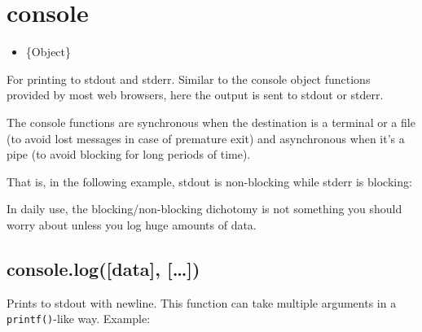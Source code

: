 \section{console}\label{console}

\begin{Shaded}
\begin{Highlighting}[]
 
\end{Highlighting}
\end{Shaded}

\begin{itemize}
\itemsep1pt\parskip0pt
\item
  \{Object\}
\end{itemize}

For printing to stdout and stderr. Similar to the console object
functions provided by most web browsers, here the output is sent to
stdout or stderr.

The console functions are synchronous when the destination is a terminal
or a file (to avoid lost messages in case of premature exit) and
asynchronous when it's a pipe (to avoid blocking for long periods of
time).

That is, in the following example, stdout is non-blocking while stderr
is blocking:

\begin{Shaded}
\begin{Highlighting}[]
 \NormalTok{> } 
\end{Highlighting}
\end{Shaded}

In daily use, the blocking/non-blocking dichotomy is not something you
should worry about unless you log huge amounts of data.

\subsection{console.log({[}data{]},
{[}\ldots{}{]})}\label{console.logdata}

Prints to stdout with newline. This function can take multiple arguments
in a \texttt{printf()}-like way. Example:

\begin{Shaded}
\end{Shaded}

